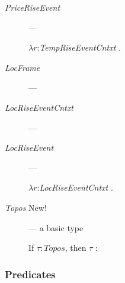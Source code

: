 \begin{description}
  \item[\textnormal{\textit{PriceRiseEvent}}] --- \mbox{}

   $\lambda
r$:\textit{TempRiseEventCntxt} .\\  
\hspace*{2em}
      
    \item[\textnormal{\textit{LocFrame}}] --- 
      
    \item[\textnormal{\textit{LocRiseEventCntxt}}] ---
                       
 \item[\textnormal{\textit{LocRiseEvent}}] ---

   $\lambda
r$:\textit{LocRiseEventCntxt} .\\  
\hspace*{2em}

      
    \item[\textnormal{\textit{Topos}} New!] --- a basic type

      If $\tau:\textit{Topos}$, then $\tau$ :  

                       


\end{description}

  \subsubsection{Predicates} 


